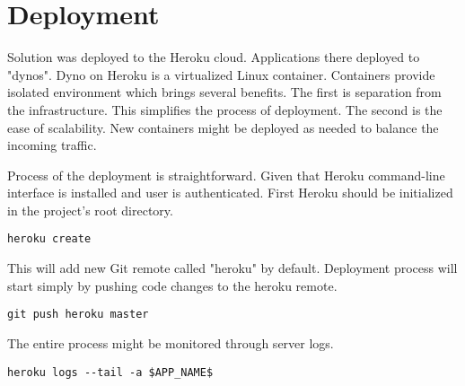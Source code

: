 
\section{Deployment}\label{sec:deployment}

Solution was deployed to the Heroku cloud.\cite{heroku}
Applications there deployed to "dynos".
Dyno on Heroku is a virtualized Linux container.
Containers provide isolated environment which brings several benefits.
The first is separation from the infrastructure.
This simplifies the process of deployment.
The second is the ease of scalability.
New containers might be deployed as needed to balance the incoming traffic.

Process of the deployment is straightforward.
Given that Heroku command-line interface is installed and user is authenticated.
First Heroku should be initialized in the project's root directory\@.

\begin{Verbatim}[frame=single]
heroku create
\end{Verbatim}

This will add new Git remote called "heroku" by default.
Deployment process will start simply by pushing code changes to the heroku remote.

\begin{Verbatim}[frame=single]
git push heroku master
\end{Verbatim}

The entire process might be monitored through server logs.

\begin{Verbatim}[frame=single]
heroku logs --tail -a $APP_NAME$
\end{Verbatim}